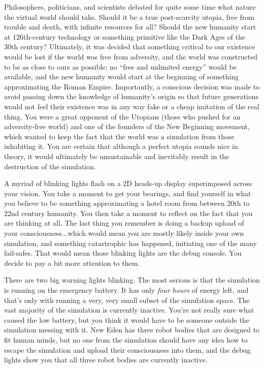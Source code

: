 \documentclass[char]{guildcamp1}
\begin{document}
Philosophers, politicians, and scientists debated for quite some time what nature the virtual world should take. Should it be a true post-scarcity utopia, free from trouble and death, with infinite resources for all? Should the new humanity start at 126th-century technology or something primitive like the Dark Ages of the 30th century? Ultimately,  it was decided that something critical to our existence would be lost if the world was free from adversity, and the world was constructed to be as close to ours as possible; no ``free and unlimited energy'' would be available, and the new humanity would start at the beginning of something approximating the Roman Empire. Importantly, a conscious decision was made to avoid passing down the knowledge of humanity's origin so that future generations would not feel their existence was in any way fake or a cheap imitation of the real thing. You were a great opponent of the Utopians (those who pushed for an adversity-free world) and one of the founders of the New Beginning movement, which wanted to keep the fact that the world was a simulation from those inhabiting it. You are certain that although a perfect utopia sounds nice in theory, it would ultimately be unsustainable and inevitably result in the destruction of the simulation.

A myriad of blinking lights flash on a 2D heads-up display superimposed across your vision. You take a moment to get your bearings, and find yourself in what you believe to be something approximating a hotel room from between 20th to 22nd century humanity. You then take a moment to reflect on the fact that you are thinking at all. The last thing you remember is doing a backup upload of your consciousness...which would mean you are mostly likely inside your own simulation, and something catastrophic has happened, initiating one of the many fail-safes. That would mean those blinking lights are the debug console. You decide to pay a bit more attention to them.

There are two big warning lights blinking. The most serious is that the simulation is running on the emergency battery. It has only \emph{four hours} of energy left, and that's only with running a very, very small subset of the simulation space. The vast majority of the simulation is currently inactive. You're not really sure what caused the low battery, but you think it would have to be someone outside the simulation messing with it. New Eden has three robot bodies that are designed to fit human minds, but no one from the simulation should have any idea how to escape the simulation and upload their consciousness into them, and the debug lights show you that all three robot bodies are currently inactive.
\end{document}
